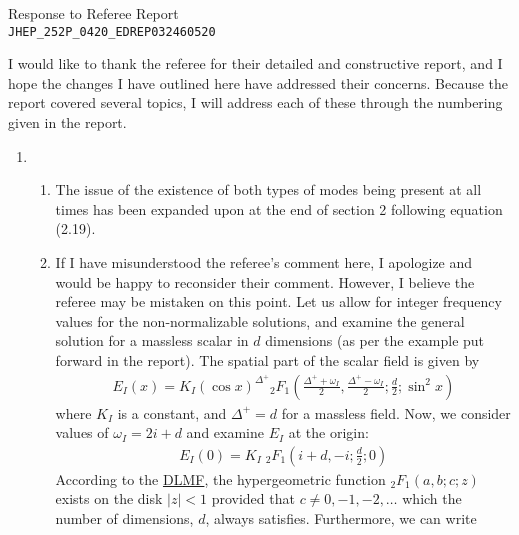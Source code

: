 \documentclass[11pt,letterpaper]{article}
\begin{document}
\vspace{.2in}
\begin{center}
    {\Large Response to Referee Report \\ \verb+JHEP_252P_0420_EDREP032460520+}  
\end{center}

\vspace{.25in}

I would like to thank the referee for their detailed and constructive
report, and I hope the changes I have outlined here have addressed their
concerns. Because the report covered several topics, I will address each
of these through the numbering given in the report.
\begin{enumerate}
    \item %
    \begin{enumerate}
        \item The issue of the existence of both types of modes being
        present at all times has been expanded upon at the end of section 2 
        following equation (2.19).
        \item If I have misunderstood the referee's comment here, I apologize and would be 
        happy to reconsider their comment. However, I believe the referee may be mistaken on this
        point. Let us allow for integer frequency values for the non-normalizable solutions,
        and examine the general solution for a massless scalar in $d$ dimensions (as 
        per the example put forward in the report). The spatial part of the scalar field
        is given by
        \begin{align}
            \label{e:NN function}
            E_I (x) = K_I \left( \cos x \right)^{\Delta^+} {_2}F_1 \left(\frac{\Delta^+ + \omega_I}{2}, \frac{\Delta^+ - \omega_I}{2}; \frac{d}{2}; \sin^2 x \right)
        \end{align}
        where $K_I$ is a constant, and $\Delta^+ = d$ for a massless field. Now, we
        consider values of $\omega_I = 2i + d$ and examine $E_I$ at the origin:
        \begin{align}
            E_I(0) = K_I \; {_2}F_1 \left( i + d, -i; \frac{d}{2}; 0 \right)
        \end{align}
        According to the \href{https://dlmf.nist.gov/15.2}{DLMF}, the hypergeometric function
        ${_2}F_1 (a, b; c; z)$ exists on the disk $| z | < 1$ provided that $c \neq 0, -1, -2, \ldots$
        which the number of dimensions, $d$, always satisfies. Furthermore, we can write
        \begin{align}

\end{align}
\end{enumerate}
\end{enumerate}
\end{document}
